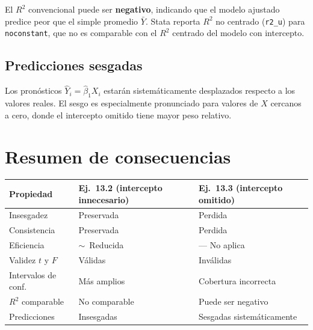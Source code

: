 \documentclass[12pt, letterpaper]{article}
\begin{document}
El $R^2$ convencional puede ser \textbf{negativo}, indicando que el modelo
ajustado predice peor que el simple promedio $\bar{Y}$. Stata reporta
$R^2$ no centrado (\texttt{r2\_u}) para \texttt{noconstant}, que no es
comparable con el $R^2$ centrado del modelo con intercepto.

\subsection{Predicciones sesgadas}

Los pronósticos $\hat{Y}_i = \hat{\beta}_1 X_i$ estarán sistemáticamente
desplazados respecto a los valores reales. El sesgo es especialmente
pronunciado para valores de $X$ cercanos a cero, donde el intercepto
omitido tiene mayor peso relativo.

\section{Resumen de consecuencias}

\begin{center}
\renewcommand{\arraystretch}{1.4}
\small
\begin{tabular}{p{4.2cm}p{4.0cm}p{4.2cm}}
\toprule
\textbf{Propiedad}
  & \textbf{Ej.~13.2} \newline (intercepto innecesario)
  & \textbf{Ej.~13.3} \newline (intercepto omitido) \\
\midrule
Insesgadez          & Preservada        & Perdida \\
Consistencia        & Preservada        & Perdida \\
Eficiencia          & $\sim$\ Reducida              & --- No aplica \\
Validez $t$ y $F$   & Válidas           & Inválidas \\
Intervalos de conf. & Más amplios           & Cobertura incorrecta \\
$R^2$ comparable    & No comparable         & Puede ser negativo \\
Predicciones        & Insesgadas        & Sesgadas sistemáticamente \\
\bottomrule
\end{tabular}
\end{center}

\end{document}
